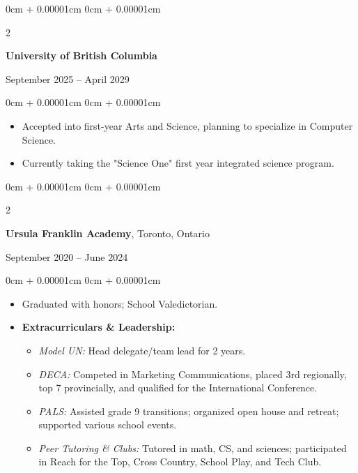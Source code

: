 \documentclass[10pt, letterpaper]{article}
\newenvironment{highlights}{
    \begin{itemize}[
        topsep=0.10cm,
        parsep=0.10cm,
        partopsep=0pt,
        itemsep=0pt,
        leftmargin=0cm + 10pt
    ]
}{
    \end{itemize}
}
\newenvironment{onecolentry}{
    \begin{adjustwidth}{
        0cm + 0.00001cm
    }{
        0cm + 0.00001cm
    }
}{
    \end{adjustwidth}
}
\newenvironment{twocolentry}[2][]{
    \onecolentry
    \def\secondColumn{#2}
    \setcolumnwidth{\fill, 5.5 cm} %
    \begin{paracol}{2}
}{
    \switchcolumn \raggedleft \secondColumn
    \end{paracol}
    \endonecolentry
}
\begin{document}
    \begin{twocolentry}{September 2025 – April 2029}
        \textbf{University of British Columbia}
    \end{twocolentry}
    \vspace{0.10cm}
    \begin{onecolentry}
        \begin{highlights}
            \item Accepted into first-year Arts and Science, planning to specialize in Computer Science.
            \item Currently taking the "Science One"  first year integrated science program. 
        \end{highlights}
    \end{onecolentry}

    \vspace{0.2cm}

    \begin{twocolentry}{September 2020 – June 2024}
    \textbf{Ursula Franklin Academy}, Toronto, Ontario
    \end{twocolentry}
    \vspace{0.10cm}
    \begin{onecolentry}
        \begin{highlights}
            \item Graduated with honors; School Valedictorian.
            \item \textbf{Extracurriculars \& Leadership:}
                \begin{itemize}[leftmargin=15pt]
                    \item \textit{Model UN:} Head delegate/team lead for 2 years.
                    \item \textit{DECA:} Competed in Marketing Communications, placed 3rd regionally, top 7 provincially, and qualified for the International Conference.
                    \item \textit{PALS:} Assisted grade 9 transitions; organized open house and retreat; supported various school events.
                    \item \textit{Peer Tutoring \& Clubs:} Tutored in math, CS, and sciences; participated in Reach for the Top, Cross Country, School Play, and Tech Club.
                \end{itemize}
        \end{highlights}
    \end{onecolentry}
\end{document}
